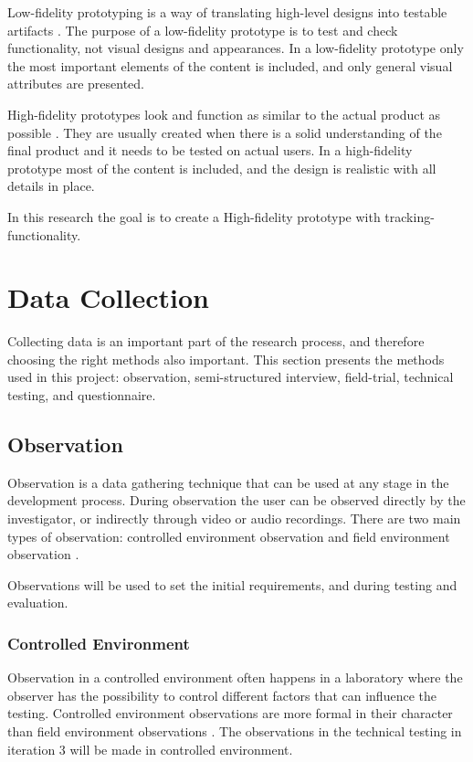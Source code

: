 \documentclass[../Main/thesis.tex]{subfiles}
\begin{document}
Low-fidelity prototyping is a way of translating high-level designs into testable artifacts \citep{Babich2017}.
The purpose of a low-fidelity prototype is to test and check functionality, not visual designs and appearances.
In a low-fidelity prototype only the most important elements of the content is included, and only general visual attributes are presented.

High-fidelity prototypes look and function as similar to the actual product as possible \citep{Babich2017}.
They are usually created when there is a solid understanding of the final product and it needs to be tested on actual users.
In a high-fidelity prototype most of the content is included, and the design is realistic with all details in place.

In this research the goal is to create a High-fidelity prototype with tracking-functionality. 

\section{Data Collection}
Collecting data is an important part of the research process, and therefore choosing the right methods also important.
This section presents the methods used in this project: observation, semi-structured interview, field-trial, technical testing, and questionnaire.

\subsection{Observation}
Observation is a data gathering technique that can be used at any stage in the development process.
During observation the user can be observed directly by the investigator, or indirectly through video or audio recordings.
There are two main types of observation: controlled environment observation and field environment observation \citep{Preece2011}.

Observations will be used to set the initial requirements, and during testing and evaluation.

\subsubsection{Controlled Environment}
Observation in a controlled environment often happens in a laboratory where the observer has the possibility to control different factors that can influence the testing.
Controlled environment observations are more formal in their character than field environment observations \citep{Preece2011}.
The observations in the technical testing in iteration 3 will be made in controlled environment.
\end{document}

